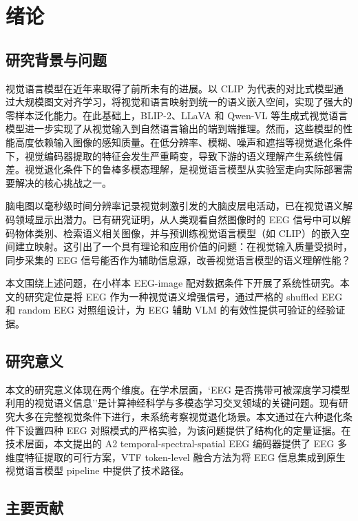\section{绪论}

\subsection{研究背景与问题}

视觉语言模型在近年来取得了前所未有的进展。以 CLIP 为代表的对比式模型通过大规模图文对齐学习，将视觉和语言映射到统一的语义嵌入空间，实现了强大的零样本泛化能力。在此基础上，BLIP-2、LLaVA 和 Qwen-VL 等生成式视觉语言模型进一步实现了从视觉输入到自然语言输出的端到端推理。然而，这些模型的性能高度依赖输入图像的感知质量。在低分辨率、模糊、噪声和遮挡等视觉退化条件下，视觉编码器提取的特征会发生严重畸变，导致下游的语义理解产生系统性偏差。视觉退化条件下的鲁棒多模态理解，是视觉语言模型从实验室走向实际部署需要解决的核心挑战之一。

脑电图以毫秒级时间分辨率记录视觉刺激引发的大脑皮层电活动，已在视觉语义解码领域显示出潜力。已有研究证明，从人类观看自然图像时的 EEG 信号中可以解码物体类别、检索语义相关图像，并与预训练视觉语言模型（如 CLIP）的嵌入空间建立映射。这引出了一个具有理论和应用价值的问题：在视觉输入质量受损时，同步采集的 EEG 信号能否作为辅助信息源，改善视觉语言模型的语义理解性能？

本文围绕上述问题，在小样本 EEG-image 配对数据条件下开展了系统性研究。本文的研究定位是将 EEG 作为一种视觉语义增强信号，通过严格的 shuffled EEG 和 random EEG 对照组设计，为 EEG 辅助 VLM 的有效性提供可验证的经验证据。

\subsection{研究意义}

本文的研究意义体现在两个维度。在学术层面，`EEG 是否携带可被深度学习模型利用的视觉语义信息''是计算神经科学与多模态学习交叉领域的关键问题。现有研究大多在完整视觉条件下进行，未系统考察视觉退化场景。本文通过在六种退化条件下设置四种 EEG 对照模式的严格实验，为该问题提供了结构化的定量证据。在技术层面，本文提出的 A2 temporal-spectral-spatial EEG 编码器提供了 EEG 多维度特征提取的可行方案，VTF token-level 融合方法为将 EEG 信息集成到原生视觉语言模型 pipeline 中提供了技术路径。

\subsection{主要贡献}

